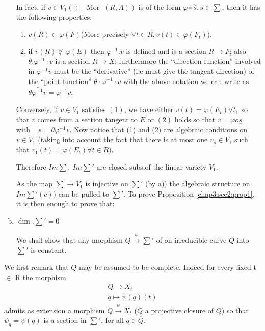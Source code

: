 \begin{enumerate}[a)]
  In fact, if $ v \in V_1 (\subset ~ \text { Mor } ~ (R,A)) $ is of
  the form $\varphi \circ \overset{\sim}{s}, s \in \sum$, then it has the
  following properties: 
  
  \begin{enumerate}[(1)]  
  \item $ v(R) \subset \varphi (F)$\pageoriginale (More precisely
    $\forall  t \in R, v(t) \in \varphi(F_t)$). 
  \item if $ v(R) \not \subset \varphi (E)$ then $\varphi^{-1}.v$ is
    defined and is a  
    section $ R \rightarrow F$; also $\theta. \varphi^{-1}\cdot v$ is a
    section $ R \rightarrow X$; furthermore the ``direction function''
    involved in $\varphi^{-1}v$ must be the ``derivative'' (i.e must
    give the tangent direction) of the ``point function''
    $\theta \cdot \varphi^{-1}\cdot v$ with the above notation we can write as $
    \theta \widetilde{\varphi^{-1}v} = \varphi^{-1} v$. 
  \end{enumerate}

  Conversely, if $ v \in V_1$ satisfies $(1)$, we have either $ v(t) =
  \varphi (E_t) \forall t, $ so that $v$ comes from a section tangent
  to $E$ or $(2)$ holds so that $ v = \varphi o \underset{\sim}{s}$ ~
  with ~ $s = \theta \varphi^{-1}v$. Now notice that (1) and (2)
  are algebraic conditions on $v\in V_1$ (taking into account the
  fact that there is at most one $v_o \in V_1$ such that $v_1(t) =
  \varphi (E_t) \forall t \in R)$. 

  Therefore $Im  \sum, ~ Im \sum'$ are closed subs.of the linear
  variety $V_1$. 

  As the map $ \sum \rightarrow V_1$ is injective on $ \sum'$ (by a))
  the algebraic structure on $ Im \sum'(c))$ can be pulled to
  $\sum'$. To prove Proposition \ref{chap3:sec2:prop1}, it is then enough to prove that: 
\item $\dim. \sum'=0$

  We shall show that any morphism $ Q\overset{\psi} \rightarrow \sum'$
  of on irreducible curve $Q$ into $\sum'$ is constant. 
\end{enumerate}

We first remark that $Q$ may be assumed to be complete. Indeed for every
fixed t $\in$ R the morphism 
\begin{gather*}
  Q \rightarrow X_t\\
  q \longmapsto \psi (q) (t) 
\end{gather*}
admits as extension a morphism  $ \bar{Q} \overset{\psi} \rightarrow
X_t$ ($\bar{Q}$ a projective closure of $Q$) so that  $\psi _q=\psi(q)$ is a
section in $\sum'$, for all $ q \in \overline{Q}$. 

